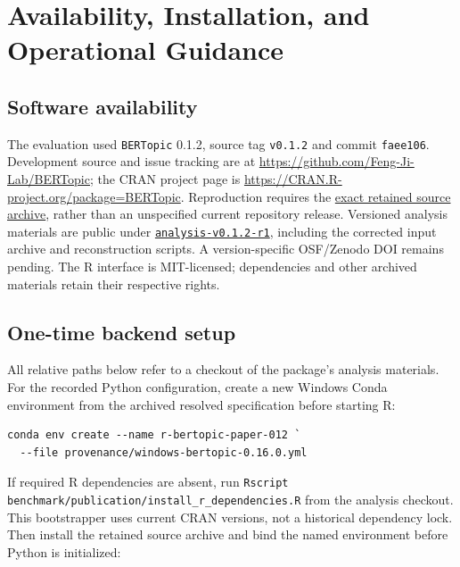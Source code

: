 \documentclass[12pt]{article}
\newcommand{\pkg}[1]{\texttt{#1}}
\newcommand{\fcode}[1]{\nolinkurl{#1}}
\begin{document}
\section{Availability, Installation, and Operational Guidance}
\label{sec:installation}

\subsection{Software availability}

The evaluation used \pkg{BERTopic} 0.1.2, source tag \fcode{v0.1.2} and commit \fcode{faee106}. Development source and issue tracking are at \url{https://github.com/Feng-Ji-Lab/BERTopic}; the CRAN project page is \url{https://CRAN.R-project.org/package=BERTopic}. Reproduction requires the \href{https://github.com/Feng-Ji-Lab/BERTopic/raw/64907e737025fe456d3673afcf0f467df4deb20d/provenance/releases/BERTopic_0.1.2.tar.gz}{exact retained source archive}, rather than an unspecified current repository release. Versioned analysis materials are public under \href{https://github.com/Feng-Ji-Lab/BERTopic/tree/analysis-v0.1.2-r1}{\fcode{analysis-v0.1.2-r1}}, including the corrected input archive and reconstruction scripts. A version-specific OSF/Zenodo DOI remains pending. The R interface is MIT-licensed; dependencies and other archived materials retain their respective rights.

\subsection{One-time backend setup}

All relative paths below refer to a checkout of the package's analysis materials. For the recorded Python configuration, create a new Windows Conda environment from the archived resolved specification before starting R:

\begin{lstlisting}[language={},float=htbp,caption={Creating the recorded Python environment from PowerShell.}]
conda env create --name r-bertopic-paper-012 `
  --file provenance/windows-bertopic-0.16.0.yml
\end{lstlisting}

If required R dependencies are absent, run \fcode{Rscript benchmark/publication/install_r_dependencies.R} from the analysis checkout. This bootstrapper uses current CRAN versions, not a historical dependency lock. Then install the retained source archive and bind the named environment before Python is initialized:
\end{document}
